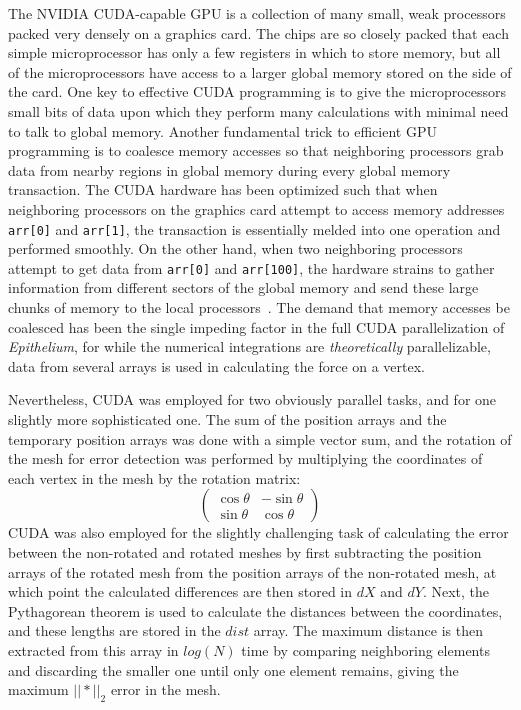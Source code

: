 The NVIDIA CUDA-capable GPU is a collection of many small, weak processors packed very densely on a graphics card. The chips are so closely packed that each simple microprocessor has only a few registers in which to store memory, but all of the microprocessors have access to a larger global memory stored on the side of the card. One key to effective CUDA programming is to give the microprocessors small bits of data upon which they perform many calculations with minimal need to talk to global memory. Another fundamental trick to efficient GPU programming is to coalesce memory accesses so that neighboring processors grab data from nearby regions in global memory during every global memory transaction. The CUDA hardware has been optimized such that when neighboring processors on the graphics card attempt to access memory addresses \texttt{arr[0]} and \texttt{arr[1]}, the transaction is essentially melded into one operation and performed smoothly. On the other hand, when two neighboring processors attempt to get data from \texttt{arr[0]} and \texttt{arr[100]}, the hardware strains to gather information from different sectors of the global memory and send these large chunks of memory to the local processors~\cite{Udacity}. The demand that memory accesses be coalesced has been the single impeding factor in the full CUDA parallelization of \emph{Epithelium}, for while the numerical integrations are \emph{theoretically} parallelizable, data from several arrays is used in calculating the force on a vertex.

Nevertheless, CUDA was employed for two obviously parallel tasks, and for one slightly more sophisticated one. The sum of the position arrays and the temporary position arrays was done with a simple vector sum, and the rotation of the mesh for error detection was performed by multiplying the coordinates of each vertex in the mesh by the rotation matrix:
\[ \left( \begin{array}{cc}
\cos\theta & -\sin\theta \\
\sin\theta & \cos\theta 
\end{array} \right)\] 
CUDA was also employed for the slightly challenging task of calculating the error between the non-rotated and rotated meshes by first subtracting the position arrays of the rotated mesh from the position arrays of the non-rotated mesh, at which point the calculated differences are then stored in $dX$ and $dY$. Next, the Pythagorean theorem is used to calculate the distances between the coordinates, and these lengths are stored in the $dist$ array. The maximum distance is then extracted from this array in $log(N)$ time by comparing neighboring elements and discarding the smaller one until only one element remains, giving the maximum $||*||_2$ error in the mesh.

